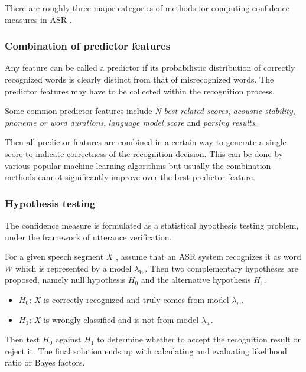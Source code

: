 \documentclass[11pt,a4paper]{report}
\begin{document}
There are roughly three major categories of methods for computing confidence measures in ASR \parencite{jiang2005confidence}.

\subsubsection{Combination of predictor features}

Any feature can be called a predictor if its probabilistic distribution of correctly recognized words is clearly distinct from that of misrecognized words.
The predictor features may have to be collected within the recognition process.

Some common predictor features include \textit{N-best related scores}, \textit{acoustic stability}, \textit{phoneme or word durations}, \textit{language model score} and \textit{parsing results}.

Then all predictor features are combined in a certain way to generate a single score to indicate correctness of the recognition decision.
This can be done by various popular machine learning algorithms but usually the combination methods cannot significantly improve over the best predictor feature.

\subsubsection{Hypothesis testing}

The confidence measure is formulated as a statistical hypothesis testing problem, under the framework of utterance verification.

For a given speech segment \(X\) , assume that an ASR system recognizes it as word \(W\) which is represented by a model \(\lambda_W\).
Then two complementary hypotheses are proposed, namely null hypothesis \(H_0\) and the alternative hypothesis \(H_1\).

\begin{itemize}
  \item \(H_0\): \(X\) is correctly recognized and truly comes from model \(\lambda_w\).
  \item \(H_1\): \(X\) is wrongly classified and is not from model \(\lambda_w\).
\end{itemize}

Then test \(H_0\) against \(H_1\) to determine whether to accept the recognition result or reject it.
The final solution ends up with calculating and evaluating likelihood ratio or Bayes factors.
\end{document}
